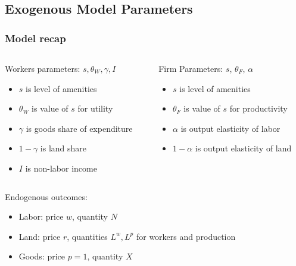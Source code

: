 \documentclass[11pt,notes=hide,aspectratio=169]{beamer}
\begin{document}
\subsection{Exogenous Model Parameters}
\begin{frame}
\frametitle{Model recap}
\begin{columns}
\begin{column}{0.49\textwidth}
Workers parameters: $s,\theta_W, \gamma, I$
\begin{itemize}
\item $s$ is level of amenities
\item $\theta_W$ is value of $s$ for utility
\item $\gamma$ is goods share of expenditure
\item $1-\gamma$ is land share
\item $I$ is non-labor income
\end{itemize}
\end{column}
\begin{column}{0.49\textwidth}
Firm Parameters: $s$, ${\theta_F}$, $\alpha$ 
\begin{itemize}
\item $s$ is level of amenities
\item $\theta_F$ is value of $s$ for productivity
\item $\alpha$ is output elasticity of labor
\item $1-\alpha$ is output elasticity of land
\end{itemize}
\vfill
\end{column}
\end{columns}
\begin{center}
Endogenous outcomes:
\begin{itemize}
\item Labor: price $w$, quantity $N$
\item Land: price $r$, quantities $L^w, L^p$ for workers and production
\item Goods: price $p=1$, quantity $X$ 
\end{itemize}
\end{center}
\end{frame}
\end{document}
